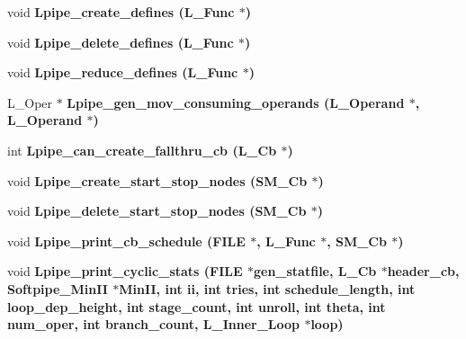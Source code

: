 \begin{CompactItemize}
void \bf{Lpipe\_\-create\_\-defines} (L\_\-Func $\ast$)
\item 
void \bf{Lpipe\_\-delete\_\-defines} (L\_\-Func $\ast$)
\item 
void \bf{Lpipe\_\-reduce\_\-defines} (L\_\-Func $\ast$)
\item 
L\_\-Oper $\ast$ \bf{Lpipe\_\-gen\_\-mov\_\-consuming\_\-operands} (L\_\-Operand $\ast$, L\_\-Operand $\ast$)
\item 
int \bf{Lpipe\_\-can\_\-create\_\-fallthru\_\-cb} (L\_\-Cb $\ast$)
\item 
void \bf{Lpipe\_\-create\_\-start\_\-stop\_\-nodes} (\bf{SM\_\-Cb} $\ast$)
\item 
void \bf{Lpipe\_\-delete\_\-start\_\-stop\_\-nodes} (\bf{SM\_\-Cb} $\ast$)
\item 
void \bf{Lpipe\_\-print\_\-cb\_\-schedule} (FILE $\ast$, L\_\-Func $\ast$, \bf{SM\_\-Cb} $\ast$)
\item 
void \bf{Lpipe\_\-print\_\-cyclic\_\-stats} (FILE $\ast$\bf{gen\_\-statfile}, L\_\-Cb $\ast$\bf{header\_\-cb}, Softpipe\_\-Min\-II $\ast$Min\-II, int ii, int tries, int schedule\_\-length, int \bf{loop\_\-dep\_\-height}, int stage\_\-count, int unroll, int theta, int num\_\-oper, int branch\_\-count, L\_\-Inner\_\-Loop $\ast$loop)
\end{CompactItemize}
